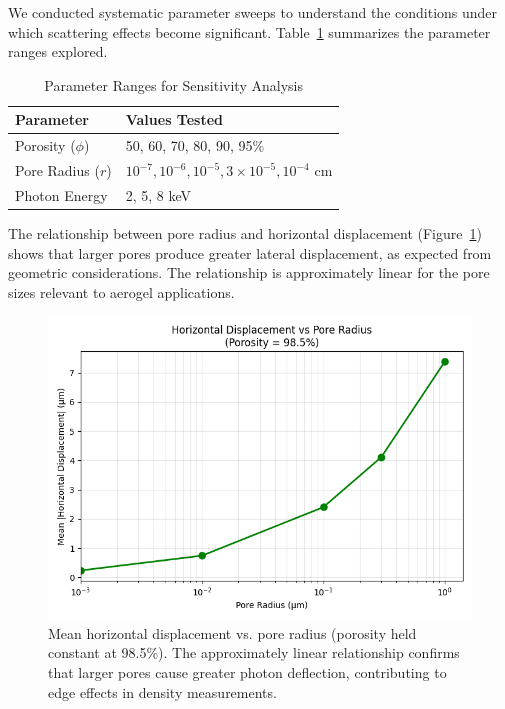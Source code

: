 \documentclass[twocolumn]{aastex701}
\begin{document}
We conducted systematic parameter sweeps to understand the conditions under which scattering effects become significant. Table~\ref{tab:sweep} summarizes the parameter ranges explored.

\begin{table}[h!]
\centering
\caption{Parameter Ranges for Sensitivity Analysis}
\begin{tabular}{ll}
\hline
\textbf{Parameter} & \textbf{Values Tested} \\
\hline
Porosity ($\phi$) & 50, 60, 70, 80, 90, 95\% \\
Pore Radius ($r$) & $10^{-7}, 10^{-6}, 10^{-5}, 3 \times 10^{-5}, 10^{-4}$ cm \\
Photon Energy & 2, 5, 8 keV \\
\hline
\end{tabular}
\label{tab:sweep}
\end{table}

The relationship between pore radius and horizontal displacement (Figure~\ref{fig:dxradius}) shows that larger pores produce greater lateral displacement, as expected from geometric considerations. The relationship is approximately linear for the pore sizes relevant to aerogel applications.

\begin{figure}[htbp]
  \centering
  \includegraphics[width=\linewidth]{dxvsporeradiusnew.png}
  \caption{Mean horizontal displacement vs. pore radius (porosity held constant at 98.5\%). The approximately linear relationship confirms that larger pores cause greater photon deflection, contributing to edge effects in density measurements.}
  \label{fig:dxradius}
\end{figure}
\end{document}
